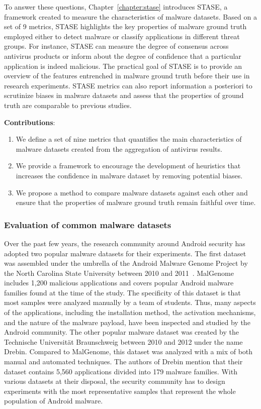 To answer these questions, Chapter~\ref{chapter:stase} introduces STASE, a framework created to measure the characteristics of malware datasets.
Based on a set of 9 metrics, STASE highlights the key properties of malware ground truth employed either to detect malware or classify applications in different threat groups.
For instance, STASE can measure the degree of consensus across antivirus products or inform about the degree of confidence that a particular application is indeed malicious.
The practical goal of STASE is to provide an overview of the features entrenched in malware ground truth before their use in research experiments.
STASE metrics can also report information a posteriori to scrutinize biases in malware datasets and assess that the properties of ground truth are comparable to previous studies.

\begin{mdframed}[hidealllines=true,nobreak=true]
\textbf{Contributions}:

\begin{enumerate}
	\item We define a set of nine metrics that quantifies the main characteristics of malware datasets created from the aggregation of antivirus results.
	\item We provide a framework to encourage the development of heuristics that increases the confidence in malware dataset by removing potential biases.
	\item We propose a method to compare malware datasets against each other and ensure that the properties of malware ground truth remain faithful over time.
\end{enumerate}
\end{mdframed}

\subsubsection{Evaluation of common malware datasets}
Over the past few years, the research community around Android security has adopted two popular malware datasets for their experiments.
The first dataset was assembled under the umbrella of the Android Malware Genome Project by the North Carolina State University between 2010 and 2011~\cite{zhou_dissecting_2012}.
MalGenome includes 1,200 malicious applications and covers popular Android malware families found at the time of the study.
The specificity of this dataset is that most samples were analyzed manually by a team of students.
Thus, many aspects of the applications, including the installation method, the activation mechanisms, and the nature of the malware payload, have been inspected and studied by the Android community.
The other popular malware dataset was created by the Technische Universität Braunschweig between 2010 and 2012 under the name Drebin.
Compared to MalGenome, this dataset was analyzed with a mix of both manual and automated techniques.
The authors of Drebin mention that their dataset contains 5,560 applications divided into 179 malware families.
With various datasets at their disposal, the security community has to design experiments with the most representative samples that represent the whole population of Android malware.

